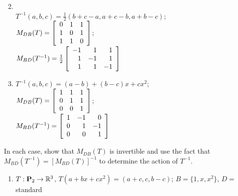 \begin{multicols}{1}
\begin{ex}
\begin{enumerate}[label={\alph*.}]
\end{enumerate}
\begin{sol}
\begin{enumerate}[label={\alph*.}]
\setcounter{enumi}{1}
\item \hspace{1em} \\
\hspace*{-1em}$T^{-1}(a, b, c) = \frac{1}{2}(b + c - a, a + c - b, a + b - c)$; \\
$M_{DB}(T) = \left[ \begin{array}{ccc} 0 & 1 & 1 \\ 1 & 0 & 1 \\ 1 & 1 & 0 \end{array} \right]$; \\ $M_{BD}(T^{-1}) = \tfrac{1}{2}\left[ \begin{array}{rrr} -1 & 1 & 1 \\ 1 & -1 & 1 \\ 1 & 1 & -1 \end{array} \right]$


\setcounter{enumi}{3}
\item $T^{-1}(a, b, c) = (a - b) + (b - c)x + cx^2$; \\
$M_{DB}(T) = \left[ \begin{array}{ccc} 1 & 1 & 1 \\ 0 & 1 & 1 \\ 0 & 0 & 1 \end{array} \right]$; \\ $M_{BD}(T^{-1}) = \left[ \begin{array}{rrr} 1 & -1 & 0 \\ 0 & 1 & -1 \\ 0 & 0 & 1 \end{array} \right]$


\end{enumerate}
\end{sol}
\end{ex}

\begin{ex}
In each case, show that $M_{DB}(T)$ is invertible and use the fact that $M_{BD}(T^{-1}) = [M_{BD}(T)]^{-1}$ to determine the action of $T^{-1}$.


\begin{enumerate}[label={\alph*.}]
\item $T : \textbf{P}_2 \to \mathbb{R}^3$, $T(a + bx + cx^2) = (a + c, c, b - c)$; $B = \{1, x, x^2\}$, $D = $ standard



\end{enumerate}
\end{ex}
\end{multicols}
